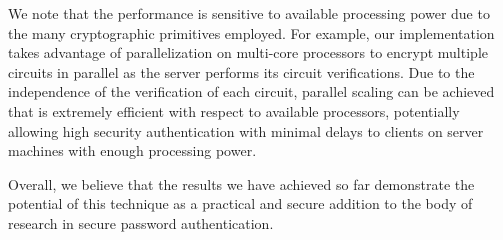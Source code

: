 We note that the performance is sensitive to available processing
power due to the many cryptographic primitives employed.  For example,
our implementation takes advantage of parallelization on multi-core
processors to encrypt multiple circuits in parallel as the server
performs its circuit verifications.  Due to the independence
of the verification of each circuit, parallel scaling can be achieved that
is extremely efficient with respect to available processors, potentially
allowing high security authentication with minimal delays to clients on 
server machines with enough processing power.

Overall, we believe that the results we have achieved so far
demonstrate the potential of this technique as a practical and secure
addition to the body of research in secure password authentication.
